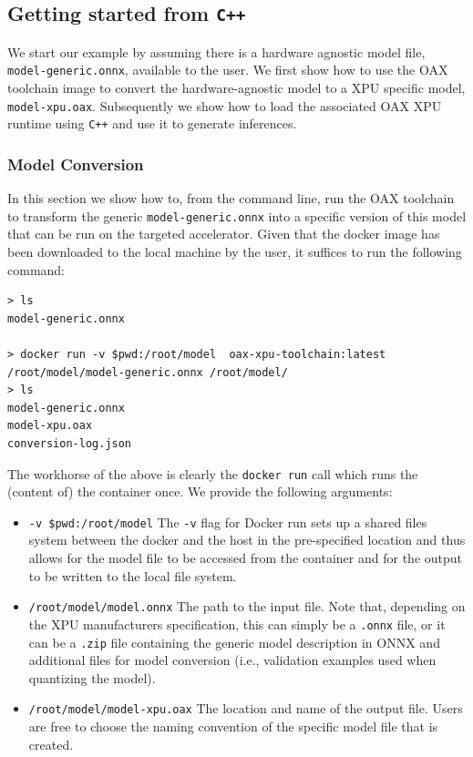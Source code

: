 \documentclass{article}
\begin{document}
\subsection{Getting started from \texttt{C++}}

We start our example by assuming there is a hardware agnostic model file, \texttt{model-generic.onnx}, available to the user. We first show how to use the OAX toolchain image to convert the hardware-agnostic model to a XPU specific model, \texttt{model-xpu.oax}. Subsequently we show how to load the associated OAX XPU runtime using \texttt{C++} and use it to generate inferences.

\subsubsection{Model Conversion}

In this section we show how to, from the command line, run the OAX toolchain to transform the generic \texttt{model-generic.onnx} into a specific version of this model that can be run on the targeted accelerator. Given that the docker image has been downloaded to the local machine by the user, it suffices to run the following command:

\begin{lstlisting}
> ls
model-generic.onnx

> docker run -v $pwd:/root/model  oax-xpu-toolchain:latest /root/model/model-generic.onnx /root/model/
> ls
model-generic.onnx
model-xpu.oax
conversion-log.json
\end{lstlisting}

The workhorse of the above is clearly the \texttt{docker run} call which runs the (content of) the container once. We provide the following arguments:
\begin{itemize}
\item \texttt{-v \$pwd:/root/model} The \texttt{-v} flag for Docker run sets up a shared files system between the docker and the host in the pre-specified location and thus allows for the model file to be accessed from the container and for the output to be written to the local file system.
\item \texttt{/root/model/model.onnx} The path to the input file. Note that, depending on the XPU manufacturers specification, this can simply be a \texttt{.onnx} file, or it can be a \texttt{.zip} file containing the generic model description in ONNX and additional files for model conversion (i.e., validation examples used when quantizing the model).
\item \texttt{/root/model/model-xpu.oax} The location and name of the output file. Users are free to choose the naming convention of the specific model file that is created.
\end{itemize}
\end{document}
